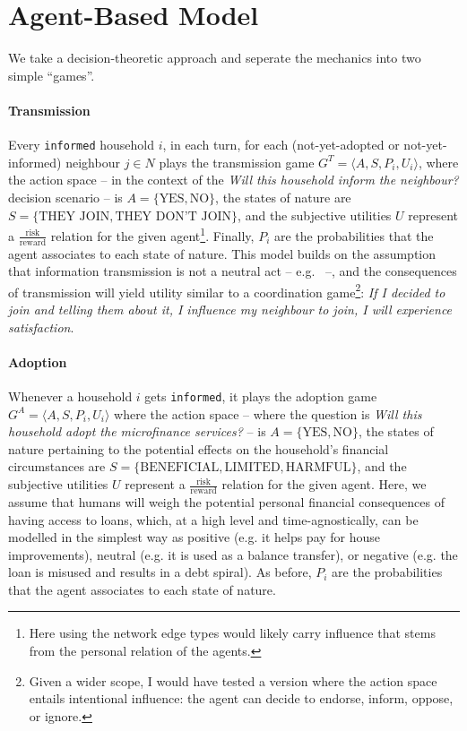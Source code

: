 \documentclass[11pt]{article}
\begin{document}
\section{Agent-Based Model}

We take a decision-theoretic approach and seperate the mechanics into two simple ``games''.

\paragraph{Transmission}
Every \texttt{informed} household $i$, in each turn, for each (not-yet-adopted or not-yet-informed) neighbour $j \in N$ plays the transmission game $G^T = \langle A, S, P_i, U_i \rangle$, where the action space -- in the context of the \textit{Will this household inform the neighbour?} decision scenario -- is $A=\{\text{YES},\text{NO}\}$, the states of nature are $S=\{\text{THEY JOIN},\text{THEY DON'T JOIN}\}$, and the subjective utilities $U$ represent a $\frac{\text{risk}}{\text{reward}}$ relation for the given agent\footnote{Here using the network edge types would likely carry influence that stems from the personal relation of the agents.}. Finally, $P_i$ are the probabilities that the agent associates to each state of nature.
This model builds on the assumption that information transmission is not a neutral act -- e.g.~\citep{04edc235-2099-36a0-9888-daf1778d57e4} --, and the consequences of transmission will yield utility similar to a coordination game\footnote{Given a wider scope, I would have tested a version where the action space entails intentional influence: the agent can decide to endorse, inform, oppose, or ignore. }: \textit{If I decided to join and telling them about it, I influence my neighbour to join, I will experience satisfaction}.

\paragraph{Adoption}
Whenever a household $i$ gets \texttt{informed}, it plays the adoption game $G^A = \langle A, S, P_i, U_i \rangle$ where the action space -- where the question is \textit{Will this household adopt the microfinance services?} -- is $A=\{\text{YES},\text{NO}\}$, the states of nature pertaining to the potential effects on the household's financial circumstances are $S=\{\text{BENEFICIAL},\text{LIMITED},\text{HARMFUL}\}$, and the subjective utilities $U$ represent a $\frac{\text{risk}}{\text{reward}}$ relation for the given agent. Here, we assume that humans will weigh the potential personal financial consequences of having access to loans, which, at a high level and time-agnostically, can be modelled in the simplest way as positive (e.g. it helps pay for house improvements), neutral (e.g. it is used as a balance transfer), or negative (e.g. the loan is misused and results in a debt spiral). As before, $P_i$ are the probabilities that the agent associates to each state of nature.
\end{document}

